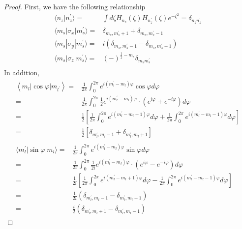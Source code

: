 \begin{proof}
First, we have the following relationship
\begin{align}
  \langle n_z | n_z^{\prime} \rangle =& \int d\zeta H_{n_z}(\zeta) H_{n_z^{\prime}}(\zeta) e^{-\zeta^2} = \delta_{n_z n_z^{\prime}}\\
  \langle m_s | \sigma_x | m_s^{\prime} \rangle =& \delta_{m_s,m_s^{\prime}+1} + \delta_{m_s,m_s^{\prime}-1}\\
  \langle m_s | \sigma_y | m_s^{\prime} \rangle =& i(\delta_{m_s,m_s^{\prime}-1} - \delta_{m_s,m_s^{\prime}+1})\\
  \langle m_s | \sigma_z | m_s^{\prime} \rangle =& (-)^{\frac{1}{2} - m_s}\delta_{m_s m_s^{\prime}}\\
\end{align}
In addition,
\begin{align}
  \begin{aligned}
  \left\langle m_{l}|\cos \varphi| m_{l^{\prime}}\right\rangle=&\frac{1}{2 \pi} \int_{0}^{2 \pi} e^{i(m_l^{\prime} - m_l) \varphi} \cos \varphi d \varphi\\
  =&\frac{1}{2 \pi} \int_{0}^{2 \pi} \frac{1}{2} e^{i(m_l^{\prime} - m_l) \varphi} \cdot\left(e^{i \varphi}+e^{-i \varphi}\right) d \varphi\\
  =&\frac{1}{2}\left[\frac{1}{2 \pi} \int_{0}^{2 \pi} e^{i(m_l^{\prime} - m_l +1) \varphi} d \varphi+\frac{1}{2 \pi} \int_{0}^{2 \pi} e^{i(m_l^{\prime} - m_l - 1) \varphi} d \varphi\right]\\
  =&\frac{1}{2}\left[\delta_{m_{l}^{\prime},m_{l}-1}+\delta_{m_{l}^{\prime},m_{l}+1}\right]
  \end{aligned} \\
  \begin{aligned}
    \langle m_{l}^{\prime}|\sin \varphi| m_{l}\rangle =& \frac{1}{2 \pi} \int_{0}^{2 \pi} e^{i(m_l^{\prime} - m_l) \varphi} \sin \varphi d \varphi\\
    =&\frac{1}{2 \pi} \int_{0}^{2 \pi} \frac{1}{2 i} e^{i(m_l^{\prime} - m_l) \varphi} \cdot (e^{i \varphi}-e^{-i \varphi} ) d \varphi \\
    =&\frac{1}{2 i} \left[ \frac{1}{2 \pi} \int_{0}^{2 \pi} e^{ i(m_l^{\prime} - m_l +1) \varphi} d \varphi-\frac{1}{2 \pi} \int_{0}^{2 \pi} e^{i (m_l^{\prime} - m_l -1) \varphi} d \varphi \right] \\
    =&\frac{1}{2 i} (\delta_{m_{l}^{\prime},m_{l}-1}-\delta _{m_{l}^{\prime},m_{l}+1} ) \\
    =&\frac{i}{2} (\delta _{m_{l}^{\prime},m_{l}+1} - \delta_{m_{l}^{\prime},m_{l}-1} )

\end{aligned}
\end{align}
\end{proof}
